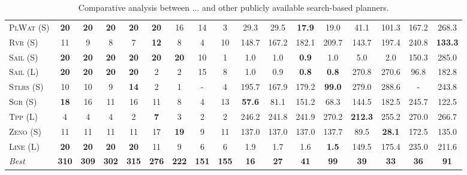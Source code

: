 \documentclass[11pt]{article}
\begin{document}
\begin{table}[tb]
{\begin{tabular}{|l||cccccccc||cccccccc||}
\textsc{PlWat} (S)&\textbf{20}&\textbf{20}&\textbf{20}&\textbf{20}&\textbf{20}&16&14&3&29.3&29.5&\textbf{17.9}&19.0&41.1&101.3&167.2&268.3\\
\textsc{Rvr} (S)&11&9&8&7&\textbf{12}&8&4&10&148.7&167.2&182.1&209.7&143.7&197.4&240.8&\textbf{133.3}\\
\textsc{Sail} (S)&\textbf{20}&\textbf{20}&\textbf{20}&\textbf{20}&\textbf{20}&\textbf{20}&10&1&1.0&1.0&\textbf{0.9}&1.0&5.0&2.0&150.3&285.0\\
\textsc{Sail} (L)&\textbf{20}&\textbf{20}&\textbf{20}&\textbf{20}&2&2&15&8&1.0&0.9&\textbf{0.8}&\textbf{0.8}&270.8&270.6&96.8&182.8\\
\textsc{Stlrs} (S)&10&10&9&\textbf{14}&2&1&-&4&195.7&167.9&179.2&\textbf{99.0}&279.0&288.6&-&243.8\\
\textsc{Sgr} (S)&\textbf{18}&16&11&16&11&8&4&13&\textbf{57.6}&81.1&151.2&68.3&144.5&182.5&245.7&122.5\\
\textsc{Tpp} (L)&4&4&4&2&\textbf{7}&3&2&2&246.2&241.8&241.9&270.2&\textbf{212.3}&255.2&270.0&266.7\\
\textsc{Zeno} (S)&11&11&11&11&17&\textbf{19}&9&11&137.0&137.0&137.0&137.7&89.5&\textbf{28.1}&172.5&135.0\\
\textsc{Line} (L)&\textbf{20}&\textbf{20}&\textbf{20}&\textbf{20}&11&9&6&6&1.9&1.7&1.6&\textbf{1.5}&149.5&175.4&235.0&211.6
\\\hline
\textit{Best}&\textbf{310}&\textbf{309}&\textbf{302}&\textbf{315}&\textbf{276}&\textbf{222}&\textbf{151}&\textbf{155}&\textbf{16}&\textbf{27}&\textbf{41}&\textbf{99}&\textbf{39}&\textbf{33}&\textbf{36}&\textbf{91}\\\hline

        \end{tabular}}
        \caption{Comparative analysis between ... and other publicly available search-based planners.}
        \label{tab:search}
        \end{table}
        
\end{document}
